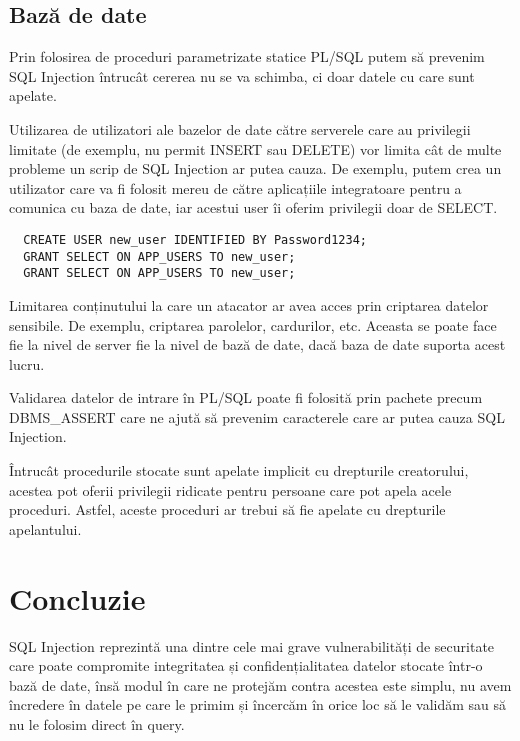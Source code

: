 \documentclass[12pt, a4paper]{report}
\begin{document}
\subsection{Bază de date}

Prin folosirea de proceduri parametrizate statice PL/SQL putem să prevenim SQL 
Injection întrucât cererea nu se va schimba, ci doar datele cu care sunt apelate.

Utilizarea de utilizatori ale bazelor de date către serverele care au privilegii limitate (de exemplu,
nu permit INSERT sau DELETE) vor limita cât de multe probleme un scrip de SQL Injection ar putea cauza. De exemplu, putem crea un utilizator care va fi folosit mereu 
de către aplicațiile integratoare pentru a comunica cu baza de date, iar acestui user îi oferim privilegii doar de SELECT.

\lstset{language=SQL}
\begin{lstlisting}
  CREATE USER new_user IDENTIFIED BY Password1234;
  GRANT SELECT ON APP_USERS TO new_user;
  GRANT SELECT ON APP_USERS TO new_user;
\end{lstlisting}

Limitarea conținutului la care un atacator ar avea acces prin criptarea datelor sensibile. De exemplu, criptarea parolelor, cardurilor, etc. 
Aceasta se poate face fie la nivel de server fie la nivel de bază de date, dacă baza de date suporta acest lucru.

Validarea datelor de intrare în PL/SQL poate fi folosită prin pachete precum
DBMS\_ASSERT care ne ajută să prevenim caracterele care ar putea cauza SQL Injection.

Întrucât procedurile stocate sunt apelate implicit cu drepturile creatorului, acestea
pot oferii privilegii ridicate pentru persoane care pot apela acele proceduri. Astfel, aceste proceduri ar trebui să fie apelate cu drepturile apelantului.


\section{Concluzie}

SQL Injection reprezintă una dintre cele mai grave vulnerabilități de securitate care poate compromite integritatea și confidențialitatea datelor stocate într-o bază de date, însă modul în care ne protejăm contra acestea este simplu, nu avem încredere 
în datele pe care le primim și încercăm în orice loc să le validăm sau să nu le folosim direct în query.




\printbibliography
\end{document}
